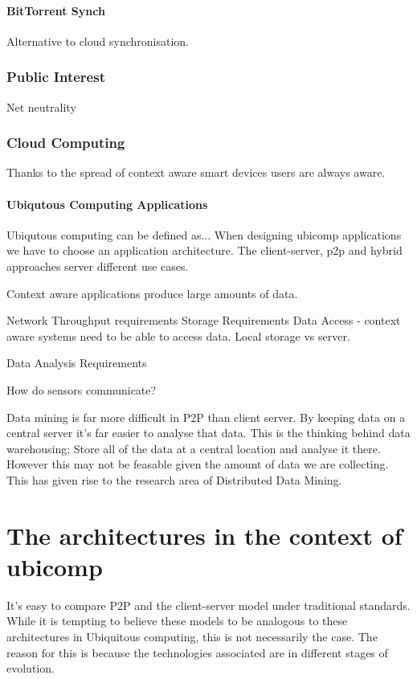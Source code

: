 \documentclass[11pt]{amsart}
\begin{document}
\subsection{BitTorrent Synch}

Alternative to cloud synchronisation.

\section{Public Interest}

Net neutrality


\section{Cloud Computing}

Thanks to the spread of context aware smart devices users are always aware.

\subsection{Ubiqutous Computing Applications}

Ubiqutous computing  can be defined as... 
When designing ubicomp applications we have to choose an application architecture. The client-server, p2p and hybrid approaches server different use cases. 

Context aware applications produce large amounts of data.

Network
Throughput requirements
Storage Requirements
Data Access - context aware systems need to be able to access data. Local storage vs server.

Data Analysis Requirements

How do sensors communicate?

Data mining is far more difficult in P2P than client server. By keeping data on a central server it's far easier to analyse that data. This is the thinking behind data warehousing; Store all of the data at a central location and analyse it there. However this may not be feasable given the amount of data we are collecting. This has given rise to the research area of Distributed Data Mining.

\part{The architectures in the context of ubicomp}

It's easy to compare P2P and the client-server model under traditional standards. While it is tempting to believe these models to be analogous to these architectures in Ubiquitous computing, this is not necessarily the case. The reason for this is because the technologies associated are in different stages of evolution.
\end{document}
